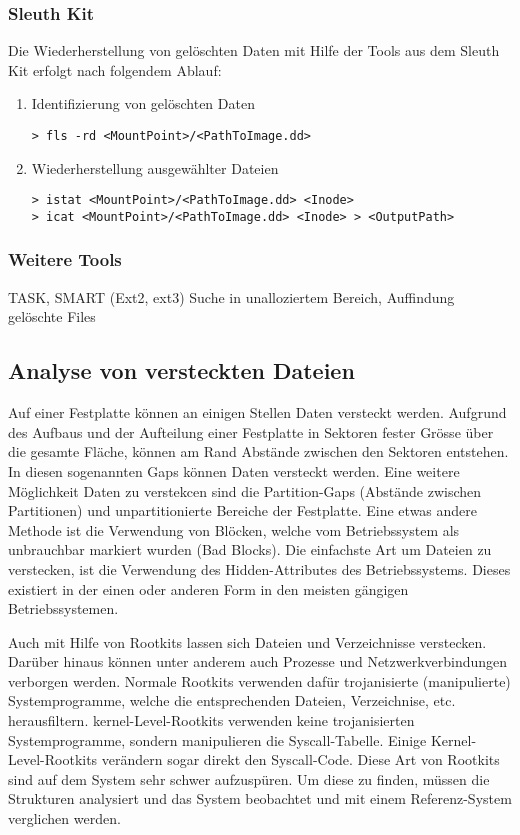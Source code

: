 \subsubsection{Sleuth Kit}
Die Wiederherstellung von gelöschten Daten mit Hilfe der Tools aus dem Sleuth Kit erfolgt nach folgendem Ablauf:
 
\begin{enumerate}
\item Identifizierung von gelöschten Daten
\begin{lstlisting}
> fls -rd <MountPoint>/<PathToImage.dd>
\end{lstlisting}
\item Wiederherstellung ausgewählter Dateien
\begin{lstlisting}
> istat <MountPoint>/<PathToImage.dd> <Inode>
> icat <MountPoint>/<PathToImage.dd> <Inode> > <OutputPath>
\end{lstlisting}
\end{enumerate}

\subsubsection{Weitere Tools}
TASK, 
SMART (Ext2, ext3) Suche in unalloziertem Bereich, Auffindung gelöschte Files



\subsection{Analyse von versteckten Dateien}
Auf einer Festplatte können an einigen Stellen Daten versteckt werden. Aufgrund des Aufbaus und der Aufteilung einer Festplatte in Sektoren fester Grösse über die gesamte Fläche, können am Rand Abstände zwischen den Sektoren entstehen. In diesen sogenannten Gaps können Daten versteckt werden. Eine weitere Möglichkeit Daten zu verstekcen sind die Partition-Gaps (Abstände zwischen Partitionen) und unpartitionierte Bereiche der Festplatte. Eine etwas andere Methode ist die Verwendung von Blöcken, welche vom Betriebssystem als unbrauchbar markiert wurden (Bad Blocks).  Die einfachste Art um Dateien zu verstecken, ist die Verwendung des Hidden-Attributes des Betriebssystems. Dieses existiert in der einen oder anderen Form in den meisten gängigen Betriebssystemen.

Auch mit Hilfe von Rootkits lassen sich Dateien und Verzeichnisse verstecken. Darüber hinaus können unter anderem auch Prozesse und Netzwerkverbindungen verborgen werden. Normale Rootkits verwenden dafür trojanisierte (manipulierte) Systemprogramme, welche die entsprechenden Dateien, Verzeichnise, etc. herausfiltern. kernel-Level-Rootkits verwenden keine trojanisierten Systemprogramme, sondern manipulieren die Syscall-Tabelle. Einige Kernel-Level-Rootkits verändern sogar direkt den Syscall-Code. Diese Art von Rootkits sind auf dem System sehr schwer aufzuspüren. Um diese zu finden, müssen die Strukturen analysiert und das System beobachtet und mit einem Referenz-System verglichen werden.

